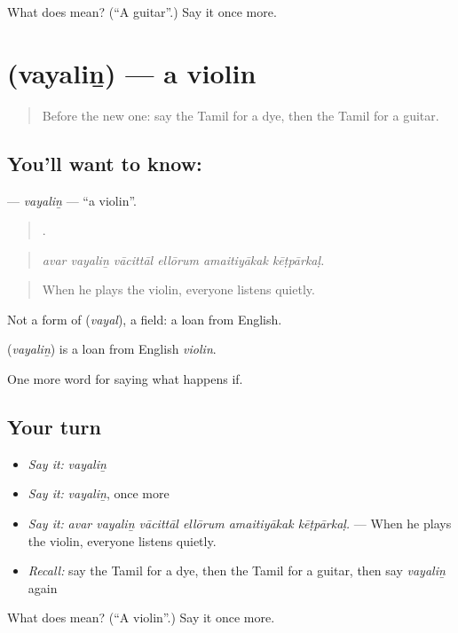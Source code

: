 \begin{tcolorbox}[breakable,colback=teal!4,colframe=teal!35!black,title={Before you move on}]
What does  mean? (\textquotedblleft{}A guitar\textquotedblright{}.) Say it once more.
\end{tcolorbox}
\section[\texorpdfstring{\ta{வயலின்} (vayaliṉ)}{வயலின் (vayaliṉ)}]{ (vayaliṉ) — a violin}

\label{lesson:TA-C557-vayalin}



\begin{quote}
Before the new one: say the Tamil for a dye, then the Tamil for a guitar.
\end{quote}

\subsection*{You'll want to know: }
\textbf{} — \emph{vayaliṉ} — \textquotedblleft{}a violin\textquotedblright{}.

\begin{quote}
     .
\end{quote}

\begin{quote}
\emph{avar vayaliṉ vācittāl ellōrum amaitiyākak kēṭpārkaḷ.}
\end{quote}

\begin{quote}
When he plays the violin, everyone listens quietly.
\end{quote}

Not a form of  (\emph{vayal}), a field: a loan from English.

\begin{cousinweb}
\textbf{} (\emph{vayaliṉ}) is a loan from English \emph{violin}.
\end{cousinweb}

\begin{grammarlens}[title={What you've built}]
One more word for saying what happens if.
\end{grammarlens}

\subsection*{Your turn}
\begin{itemize}
\raggedright
  \item \emph{Say it:} \emph{vayaliṉ}
  \item \emph{Say it:} \emph{vayaliṉ}, once more
  \item \emph{Say it:} \emph{avar vayaliṉ vācittāl ellōrum amaitiyākak kēṭpārkaḷ.} — When he plays the violin, everyone listens quietly.
  \item \emph{Recall:} say the Tamil for a dye, then the Tamil for a guitar, then say \emph{vayaliṉ} again
\end{itemize}

\begin{tcolorbox}[breakable,colback=teal!4,colframe=teal!35!black,title={Before you move on}]
What does  mean? (\textquotedblleft{}A violin\textquotedblright{}.) Say it once more.
\end{tcolorbox}
